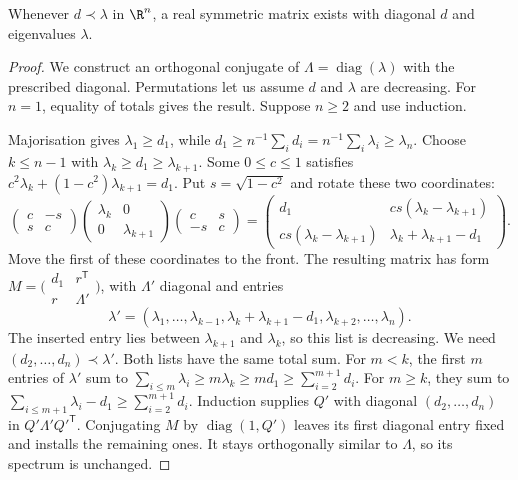 \begin{theorem}[Horn, 1954]\label{linear:thm:horn}
Whenever $d\prec\lambda$ in $\R^n$, a real symmetric matrix exists with diagonal $d$ and eigenvalues $\lambda$.
\end{theorem}
\begin{proof}
We construct an orthogonal conjugate of $\Lambda=\operatorname{diag}(\lambda)$ with the prescribed diagonal. Permutations let us assume $d$ and $\lambda$ are decreasing. For $n=1$, equality of totals gives the result. Suppose $n\ge2$ and use induction.

Majorisation gives $\lambda_1\ge d_1$, while $d_1\ge n^{-1}\sum_i d_i=n^{-1}\sum_i\lambda_i\ge\lambda_n$. Choose $k\le n-1$ with $\lambda_k\ge d_1\ge\lambda_{k+1}$. Some $0\le c\le1$ satisfies $c^2\lambda_k+(1-c^2)\lambda_{k+1}=d_1$. Put $s=\sqrt{1-c^2}$ and rotate these two coordinates:
\[\begin{pmatrix}c&-s\\s&c\end{pmatrix}
\begin{pmatrix}\lambda_k&0\\0&\lambda_{k+1}\end{pmatrix}
\begin{pmatrix}c&s\\-s&c\end{pmatrix}
=\begin{pmatrix}d_1&cs(\lambda_k-\lambda_{k+1})\\cs(\lambda_k-\lambda_{k+1})&\lambda_k+\lambda_{k+1}-d_1\end{pmatrix}.\]
Move the first of these coordinates to the front. The resulting matrix has form $M=\bigl(\begin{smallmatrix}d_1&r^{\mathsf T}\\r&\Lambda'\end{smallmatrix}\bigr)$, with $\Lambda'$ diagonal and entries
\[\lambda'=(\lambda_1,\dots,\lambda_{k-1},\lambda_k+\lambda_{k+1}-d_1,\lambda_{k+2},\dots,\lambda_n).\]
The inserted entry lies between $\lambda_{k+1}$ and $\lambda_k$, so this list is decreasing. We need $(d_2,\dots,d_n)\prec\lambda'$. Both lists have the same total sum. For $m<k$, the first $m$ entries of $\lambda'$ sum to $\sum_{i\le m}\lambda_i\ge m\lambda_k\ge md_1\ge\sum_{i=2}^{m+1}d_i$. For $m\ge k$, they sum to $\sum_{i\le m+1}\lambda_i-d_1\ge\sum_{i=2}^{m+1}d_i$. Induction supplies $Q'$ with diagonal $(d_2,\dots,d_n)$ in $Q'\Lambda'Q'^{\mathsf T}$. Conjugating $M$ by $\operatorname{diag}(1,Q')$ leaves its first diagonal entry fixed and installs the remaining ones. It stays orthogonally similar to $\Lambda$, so its spectrum is unchanged.
\end{proof}

